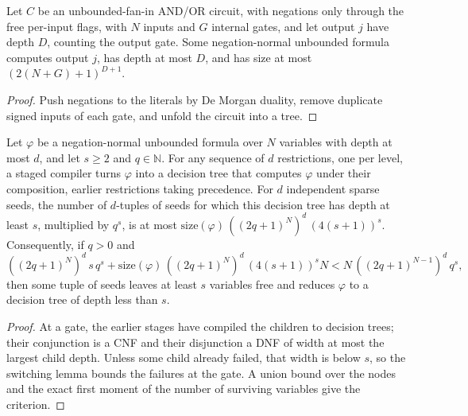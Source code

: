 \begin{theorem}
  \label{thm:lowerbounds-ac0-normalization}
  \leanok
  Let $C$ be an unbounded-fan-in AND/OR circuit, with negations only through
  the free per-input flags, with $N$ inputs and $G$ internal gates, and let
  output $j$ have depth $D$, counting the output gate. Some negation-normal
  unbounded formula computes output $j$, has depth at most $D$, and has size at
  most $(2(N + G) + 1)^{D+1}$.
\end{theorem}
\begin{proof}
  \leanok
  Push negations to the literals by De Morgan duality, remove duplicate signed
  inputs of each gate, and unfold the circuit into a tree.
\end{proof}

\begin{theorem}
  \label{thm:lowerbounds-staged-switching}
  \leanok
  Let $\varphi$ be a negation-normal unbounded formula over $N$ variables with
  depth at most $d$, and let $s \ge 2$ and $q \in \mathbb{N}$. For any
  sequence of $d$ restrictions, one per level, a staged compiler turns
  $\varphi$ into a decision tree that computes $\varphi$ under their composition,
  earlier restrictions taking precedence. For $d$ independent sparse seeds, the
  number of $d$-tuples of seeds for which this decision tree has depth at least
  $s$, multiplied by $q^s$, is at most
  $\mathrm{size}(\varphi)\,((2q+1)^N)^d\,(4(s + 1))^s$. Consequently, if $q > 0$
  and
  \[ ((2q+1)^N)^d\, s\, q^s + \mathrm{size}(\varphi)\,((2q+1)^N)^d\,(4(s+1))^s N
     < N\, ((2q+1)^{N-1})^d\, q^s , \]
  then some tuple of seeds leaves at least $s$ variables free and reduces
  $\varphi$ to a decision tree of depth less than $s$.
\end{theorem}
\begin{proof}
  \leanok
  At a gate, the earlier stages have compiled the children to decision trees;
  their conjunction is a CNF and their disjunction a DNF of width at most the
  largest child depth. Unless some child already failed, that width is below
  $s$, so the switching lemma bounds the failures at the gate. A union bound
  over the nodes and the exact first moment of the number of surviving
  variables give the criterion.
\end{proof}

